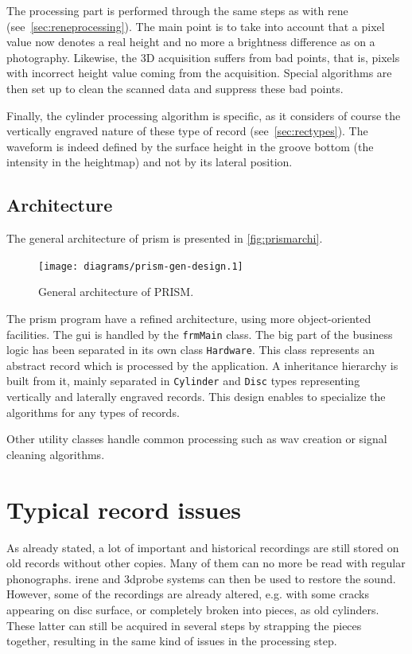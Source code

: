 The processing part is performed through the same steps as with \gls{rene} (see~\autoref{sec:reneprocessing}). The main point is to take into account that a pixel value now denotes a real height and no more a brightness difference as on a photography. Likewise, the 3D acquisition suffers from bad points, that is, pixels with incorrect height value coming from the acquisition. Special algorithms are then set up to clean the scanned data and suppress these bad points.

Finally, the cylinder processing algorithm is specific, as it considers of course the vertically engraved nature of these type of record (see~\autoref{sec:rectypes}). The waveform is indeed defined by the surface height in the groove bottom (the intensity in the heightmap) and not by its lateral position.

\subsection{Architecture}
\label{sec:prismarchi}

The general architecture of \gls{prism} is presented in \autoref{fig:prismarchi}.

\begin{figure}[!ht]
\centering
\texttt{[image: diagrams/prism-gen-design.1]}
\caption{General architecture of PRISM.}
\label{fig:prismarchi}
\end{figure}

The \gls{prism} program have a refined architecture, using more object-oriented facilities. The \gls{gui} is handled by the \texttt{frmMain} class. The big part of the business logic has been separated in its own class \texttt{Hardware}. This class represents an abstract record which is processed by the application. A inheritance hierarchy is built from it, mainly separated in \texttt{Cylinder} and \texttt{Disc} types representing vertically and laterally engraved records. This design enables to specialize the algorithms for any types of records.

Other utility classes handle common processing such as \gls{wav} creation or signal cleaning algorithms.

\section{Typical record issues}

As already stated, a lot of important and historical recordings are still stored on old records without other copies. Many of them can no more be read with regular phonographs. \gls{irene} and \gls{3dprobe} systems can then be used to restore the sound. However, some of the recordings are already altered, e.g. with some cracks appearing on disc surface, or completely broken into pieces, as old cylinders. These latter can still be acquired in several steps by strapping the pieces together, resulting in the same kind of issues in the processing step.

